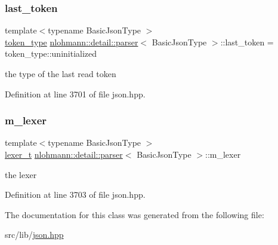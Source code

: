 \mbox{\label{classnlohmann_1_1detail_1_1parser_a932e49f6f4d291557846744319245994}} 
\subsubsection{\texorpdfstring{last\+\_\+token}{last\_token}}
{\footnotesize\ttfamily template$<$typename Basic\+Json\+Type $>$ \\
\hyperlink{classnlohmann_1_1detail_1_1parser_a21d247111b332785b7acf3f8e487d117}{token\+\_\+type} \hyperlink{classnlohmann_1_1detail_1_1parser}{nlohmann\+::detail\+::parser}$<$ Basic\+Json\+Type $>$\+::last\+\_\+token = token\+\_\+type\+::uninitialized\hspace{0.3cm}{\ttfamily [private]}}



the type of the last read token 



Definition at line 3701 of file json.\+hpp.

\mbox{\label{classnlohmann_1_1detail_1_1parser_a22dcc815551a4052b87797b34171b352}} 
\subsubsection{\texorpdfstring{m\+\_\+lexer}{m\_lexer}}
{\footnotesize\ttfamily template$<$typename Basic\+Json\+Type $>$ \\
\hyperlink{classnlohmann_1_1detail_1_1parser_a16030c5af158a94d1c799f82ff3a0147}{lexer\+\_\+t} \hyperlink{classnlohmann_1_1detail_1_1parser}{nlohmann\+::detail\+::parser}$<$ Basic\+Json\+Type $>$\+::m\+\_\+lexer\hspace{0.3cm}{\ttfamily [private]}}



the lexer 



Definition at line 3703 of file json.\+hpp.



The documentation for this class was generated from the following file\+:\begin{DoxyCompactItemize}
\item 
src/lib/\hyperlink{json_8hpp}{json.\+hpp}\end{DoxyCompactItemize}
